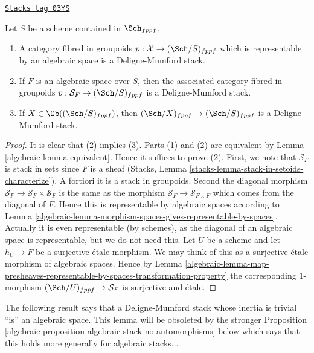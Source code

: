\begin{lemma}
\label{algebraic-lemma-representable-algebraic}
\href{https://stacks.math.columbia.edu/tag/03YS}{\texttt{Stacks tag 03YS}}

Let $S$ be a scheme contained in $\Sch_{fppf}$.
\begin{enumerate}
\item A category fibred in groupoids
$p : \mathcal{X} \to (\Sch/S)_{fppf}$
which is representable by an algebraic space is a Deligne-Mumford stack.
\item If $F$ is an algebraic space over $S$, then the associated
category fibred in groupoids
$p : \mathcal{S}_F \to (\Sch/S)_{fppf}$
is a Deligne-Mumford stack.
\item If $X \in \Ob((\Sch/S)_{fppf})$, then
$(\Sch/X)_{fppf} \to (\Sch/S)_{fppf}$ is
a Deligne-Mumford stack.
\end{enumerate}
\end{lemma}

\begin{proof}

It is clear that (2) implies (3).
Parts (1) and (2) are equivalent by Lemma \ref{algebraic-lemma-equivalent}.
Hence it suffices to prove (2).
First, we note that $\mathcal{S}_F$ is stack in sets since
$F$ is a sheaf (Stacks, Lemma
\ref{stacks-lemma-stack-in-setoids-characterize}).
A fortiori it is a stack in groupoids. Second the diagonal
morphism $\mathcal{S}_F \to \mathcal{S}_F  \times \mathcal{S}_F$
is the same as the morphism $\mathcal{S}_F \to \mathcal{S}_{F \times F}$
which comes from the diagonal of $F$. Hence this is representable
by algebraic spaces according to
Lemma \ref{algebraic-lemma-morphism-spaces-gives-representable-by-spaces}.
Actually it is even representable (by schemes), as the diagonal of
an algebraic space is representable, but we do not need this.
Let $U$ be a scheme and let $h_U \to F$ be a surjective \'etale morphism.
We may think of this as a surjective \'etale morphism of algebraic spaces.
Hence by
Lemma
\ref{algebraic-lemma-map-presheaves-representable-by-spaces-transformation-property}
the corresponding $1$-morphism $(\Sch/U)_{fppf} \to \mathcal{S}_F$
is surjective and \'etale.
\end{proof}

The following result says that a Deligne-Mumford stack whose inertia
is trivial ``is'' an algebraic space. This lemma will be obsoleted by
the stronger
Proposition \ref{algebraic-proposition-algebraic-stack-no-automorphisms}
below which says that this holds more generally for algebraic stacks...

